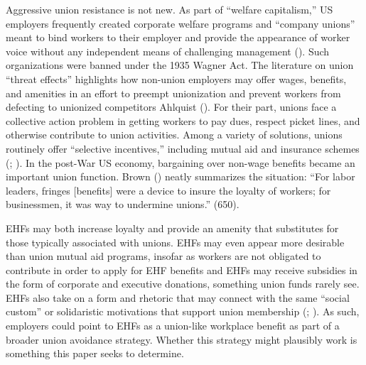 \documentclass[
  11pt,
  oneside]{article}
\begin{document}
Aggressive union resistance is not new. As part of ``welfare capitalism,'' US employers frequently created corporate welfare programs and ``company unions'' meant to bind workers to their employer and provide the appearance of worker voice without any independent means of challenging management (). Such organizations were banned under the 1935 Wagner Act. The literature on union ``threat effects'' highlights how non-union employers may offer wages, benefits, and amenities in an effort to preempt unionization and prevent workers from defecting to unionized competitors Ahlquist (). For their part, unions face a collective action problem in getting workers to pay dues, respect picket lines, and otherwise contribute to union activities. Among a variety of solutions, unions routinely offer ``selective incentives,'' including mutual aid and insurance schemes (; ). In the post-War US economy, bargaining over non-wage benefits became an important union function. Brown () neatly summarizes the situation: ``For labor leaders, fringes {[}benefits{]} were a device to insure the loyalty of workers; for businessmen, it was way to undermine unions.'' (650).

EHFs may both increase loyalty and provide an amenity that substitutes for those typically associated with unions. EHFs may even appear more desirable than union mutual aid programs, insofar as workers are not obligated to contribute in order to apply for EHF benefits and EHFs may receive subsidies in the form of corporate and executive donations, something union funds rarely see. EHFs also take on a form and rhetoric that may connect with the same ``social custom'' or solidaristic motivations that support union membership (; ). As such, employers could point to EHFs as a union-like workplace benefit as part of a broader union avoidance strategy. Whether this strategy might plausibly work is something this paper seeks to determine.
\end{document}
